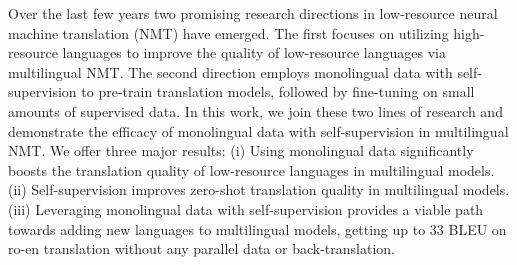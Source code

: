 Over the last few years two promising research directions in low-resource neural machine translation (NMT) have emerged. The first focuses on utilizing high-resource languages to improve the quality of low-resource languages via multilingual NMT. The second direction employs monolingual data with self-supervision to pre-train translation models, followed by fine-tuning on small amounts of supervised data. In this work, we join these two lines of research and demonstrate the efficacy of monolingual data with self-supervision in multilingual NMT. We offer three major results: (i) Using monolingual data significantly boosts the translation quality of low-resource languages in multilingual models. (ii) Self-supervision improves zero-shot translation quality in multilingual models. (iii) Leveraging monolingual data with self-supervision provides a viable path towards adding new languages to multilingual models, getting up to 33 BLEU on ro-en translation without any parallel data or back-translation.
